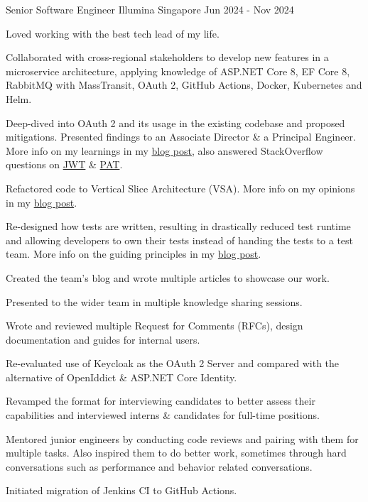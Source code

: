 \begin{cventries}
\cventry
{Senior Software Engineer} %
{Illumina} %
{Singapore} %
{Jun 2024 - Nov 2024} %
{
  \begin{cvitems} %
    \item {Loved working with the best tech lead of my life.}
    \item {Collaborated with cross-regional stakeholders to develop new features in a microservice architecture, applying knowledge of ASP.NET Core 8, EF Core 8, RabbitMQ with MassTransit, OAuth 2, GitHub Actions, Docker, Kubernetes and Helm.}
    \item {Deep-dived into OAuth 2 and its usage in the existing codebase and proposed mitigations. Presented findings to an Associate Director \& a Principal Engineer. More info on my learnings in my \href{https://bit.ly/zy-oauth2}{blog post}, also answered StackOverflow questions on \href{https://bit.ly/zy-jwt}{JWT} \& \href{https://bit.ly/zy-pat}{PAT}.}
    \item {Refactored code to Vertical Slice Architecture (VSA). More info on my opinions in my \href{https://bit.ly/zy-vsa}{blog post}.}
    \item {Re-designed how tests are written, resulting in drastically reduced test runtime and allowing developers to own their tests instead of handing the tests to a test team. More info on the guiding principles in my \href{https://bit.ly/zy-tests}{blog post}.}
    \item {Created the team's blog and wrote multiple articles to showcase our work.}
    \item {Presented to the wider team in multiple knowledge sharing sessions.}
    \item {Wrote and reviewed multiple Request for Comments (RFCs), design documentation and guides for internal users.}
    \item {Re-evaluated use of Keycloak as the OAuth 2 Server and compared with the alternative of OpenIddict \& ASP.NET Core Identity.}
    \item {Revamped the format for interviewing candidates to better assess their capabilities and interviewed interns \& candidates for full-time positions.}
    \item {Mentored junior engineers by conducting code reviews and pairing with them for multiple tasks. Also inspired them to do better work, sometimes through hard conversations such as performance and behavior related conversations.}
    \item {Initiated migration of Jenkins CI to GitHub Actions.}
  \end{cvitems}
}


\end{cventries}
